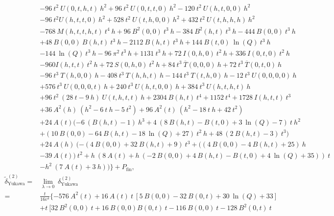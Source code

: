 \documentclass[a4paper,12pt]{book}
\begin{document}
\begin{appendices}
\begin{align}
 \nonumber
 &-96\>t^2\> U(0,t,h,t)\> h^2+96 \>t^2 \> U(0,t,t,0)\> h^2-120\>
t^2\> U(h,t,0,0)\> h^2\\
\nonumber
&-96\> t^2
   U(h,t,t,0)\> h^2+528\> t^2\> U(t,h,0,0) \>h^2+432\> t^2\> U(t,h,h,h)
\>h^2\\
\nonumber
&-768\> M(h,t,t,h,t) \>t^4 \>h+96\>
   B^2(0,0)\> t^3\> h-384\> B^2(h,t) \>t^3 \>h-444\> B(0,0)\> t^3 \>h\\
   \nonumber
   &+48 \>B(0,0)\> B(h,t)\> t^3\> h-2112\>
   B(h,t)\> t^3\> h+144\> B(t,0)\> \ln(Q)\> t^3 \>h\\
   \nonumber
   &-144 \>\ln(Q)\> t^3 \>h-96 \>\pi^2\> t^3\>
h+1131\> t^3\> h+72\> I(0,h,0)\> t^2
  \> h+336\> I(0,t,0)\> t^2\> h\\
  \nonumber
  &-960 I(h,t,t)\> t^2\> h+72\> S(0,h,0)\> t^2\> h+84\>
t^3\> \overline{T}(0,0,0)\> h+72\> t^3\>
   \overline{T}(0,t,0)\> h\\
   \nonumber&
   -96\> t^3\> T(h,0,0)\> h-408\> t^3\> T(h,h,t) \>h-144\> t^3\> T(t,h,0) \>h-12\> t^3
\>   U(0,0,0,0)\> h\\
   \nonumber&
   +576\> t^3\> U(0,0,0,t)\> h+240\> t^3\> U(h,t,0,0)\> h+384\> t^3\> U(h,t,h,t)\> h\\
   \nonumber&
   +96\> t^2\> (28\> t-9\>
   h) \> U(t,h,t,t)\> h+2304\> B(h,t)\> t^4+1152\> t^4+1728\> I(h,t,t)\>
t^3\\
   \nonumber&
   +36\> A^2(h)\> (h^2-6\> t \>h-5
   \>t^2)+96\> A^2(t) \>(h^2-18\> t \>h+42\> t^2)\\
   \nonumber&
   +24\> A(t)
(-6\> (B(h,t)-1)\> h^3+4\>
   (8\> B(h,t)-B(t,0)+3\> \ln(Q)-7)\> t \>h^2\\
   \nonumber&
   +(10\> B(0,0)-64\> B(h,t)-18\>
\ln(Q)+27)\> t^2\> h+48\> (2
 \>  B(h,t)-3)\> t^3)\\
   \nonumber&
   +24\> A(h)\> (-(4\> B(0,0)+32\>
B(h,t)+9)\> t^3+((4 \>B(0,0)-4\>
   B(h,t)+25)\> h\\
   \nonumber&
   -39\> A(t))\> t^2+h \>(8\> A(t)+h\> (-2\> B(0,0)+4
\>B(h,t)-B(t,0)+4\> \ln(Q)+35))\>
   t\\
&-h^2\> (7\> A(t)+3\> h))\}+P_\text{fin},\\
\nonumber
\tilde{\delta}^{(2)}_\text{Yukawa} ={}& \lim_{\lambda\rightarrow 0}\> \delta^{(2)}_\text{Yukawa}\\
\nonumber 
={}& \frac{t}{16 v^4}\{-576\> A^2(t)+16 \> A(t) \> t\> [5\> B(0,0)-32\>
B(0,t)+30\> \ln(Q)+33]\\
\nonumber
&+t\> [32\ B^2(0,0)\> t+16\> B(0,0) B(0,t)\> t-116\> B(0,0)\> t-128\> B^2(0,t)\> t\\

\end{align}
\end{appendices}
\end{document}
